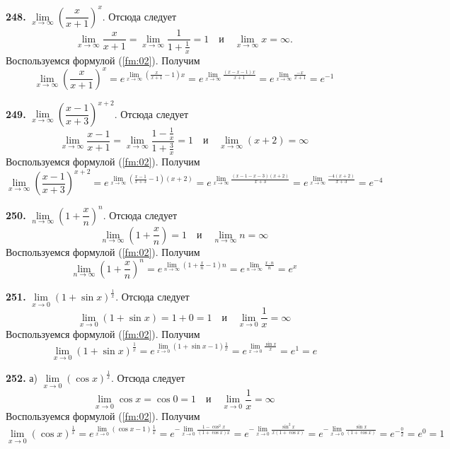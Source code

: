 \documentclass[12pt]{article}
\begin{document}
	\medskip
	{\bf 248.} $\lim\limits_{x\to\infty}\left(\dfrac{x}{x+1}\right)^x$. Отсюда следует
	\[
		\lim\limits_{x\to\infty}\dfrac{x}{x+1} = \lim\limits_{x\to\infty}\dfrac{1}{1+\frac{1}{x}} = 1\quad\text{и}\quad\lim\limits_{x\to\infty}x = \infty.
	\]
	Воспользуемся формулой (\ref{fm:02}). Получим
	\[
		\lim\limits_{x\to\infty}\left(\dfrac{x}{x+1}\right)^x = e^{\lim\limits_{x\to\infty}\left(\frac{x}{x+1}-1\right)x} = e^{\lim\limits_{x\to\infty}\frac{(x-x-1)x}{x+1}} = e^{\lim\limits_{x\to\infty}\frac{-x}{x+1}} = e^{-1}
	\]
	
	\medskip
	{\bf 249.} $\lim\limits_{x\to\infty}\left(\dfrac{x-1}{x+3}\right)^{x+2}$. Отсюда следует
	\[
		\lim\limits_{x\to\infty}\dfrac{x-1}{x+1} = \lim\limits_{x\to\infty}\dfrac{1-\frac{1}{x}}{1+\frac{3}{x}} = 1\quad\text{и}\quad\lim\limits_{x\to\infty}(x+2)=\infty
	\]
	Воспользуемся формулой (\ref{fm:02}). Получим
	\[
		\lim\limits_{x\to\infty}\left(\dfrac{x-1}{x+3}\right)^{x+2} = e^{\lim\limits_{x\to\infty}\left(\frac{x-1}{x+3}-1\right)(x+2)} = e^{\lim\limits_{x\to\infty}\frac{(x-1-x-3)(x+2)}{x+3}} = e^{\lim\limits_{x\to\infty}\frac{-4(x+2)}{x+3}} = e^{-4}
	\]
	
	\medskip
	{\bf 250.} $\lim\limits_{n\to\infty}\left(1+\dfrac{x}{n}\right)^n$. Отсюда следует
	\[
		\lim\limits_{n\to\infty}\left(1+\dfrac{x}{n}\right) = 1\quad\text{и}\quad\lim\limits_{n\to\infty}n = \infty
	\]
	Воспользуемся формулой (\ref{fm:02}). Получим
	\[
		\lim\limits_{n\to\infty}\left(1+\dfrac{x}{n}\right)^n = e^{\lim\limits_{n\to\infty}\left(1+\frac{x}{n}-1\right)n} = e^{\lim\limits_{n\to\infty}\frac{x\cdot n}{n}} = e^x
	\]
	
	
	\medskip
	{\bf 251.} $\lim\limits_{x\to0}(1+\sin x)^{\frac{1}{x}}$. Отсюда следует
	\[
		\lim\limits_{x\to0}(1+\sin x) = 1+0 =1\quad\text{и}\quad\lim\limits_{x\to0}\dfrac{1}{x} = \infty
	\]
	Воспользуемся формулой (\ref{fm:02}). Получим
	\[
		\lim\limits_{x\to0}(1+\sin x)^{\frac{1}{x}} = e^{\lim\limits_{x\to0}(1+\sin x-1)\frac{1}{x}} = e^{\lim\limits_{x\to0}\frac{\sin x}{x}} = e^1=e
	\]
	
	\medskip
	{\bf 252.} а) $\lim\limits_{x\to0}(\cos x)^{\frac{1}{x}}$. Отсюда следует
	\[
		\lim\limits_{x\to0}\cos x = \cos 0 = 1\quad \text{и}\quad\lim\limits_{x\to0}\dfrac{1}{x} = \infty
	\]
	Воспользуемся формулой (\ref{fm:02}). Получим
	\[
		\lim\limits_{x\to0}(\cos x)^{\frac{1}{x}} = e^{\lim\limits_{x\to0}(\cos x-1)\frac{1}{x}} = e^{-\lim\limits_{x\to0}\frac{1-\cos^2 x}{(1+\cos x)x}} = e^{-\lim\limits_{x\to0}\frac{\sin^2 x}{x(1+\cos x)}} = e^{-\lim\limits_{x\to0}\frac{\sin x}{(1+\cos x)}} = e^{-\frac{0}{2}} = e^0 = 1
	\]
	
\end{document}
